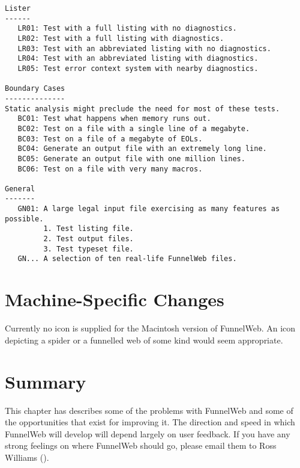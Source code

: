 \begin{verbatim}
Lister
------
   LR01: Test with a full listing with no diagnostics.
   LR02: Test with a full listing with diagnostics.
   LR03: Test with an abbreviated listing with no diagnostics.
   LR04: Test with an abbreviated listing with diagnostics.
   LR05: Test error context system with nearby diagnostics.

Boundary Cases
--------------
Static analysis might preclude the need for most of these tests.
   BC01: Test what happens when memory runs out.
   BC02: Test on a file with a single line of a megabyte.
   BC03: Test on a file of a megabyte of EOLs.
   BC04: Generate an output file with an extremely long line.
   BC05: Generate an output file with one million lines.
   BC06: Test on a file with very many macros.

General
-------
   GN01: A large legal input file exercising as many features as possible.
         1. Test listing file.
         2. Test output files.
         3. Test typeset file.
   GN... A selection of ten real-life FunnelWeb files.
\end{verbatim}

\section{Machine-Specific Changes}

 Currently no icon is supplied for the
Macintosh version of FunnelWeb. An icon depicting a spider or a funnelled
web of some kind would seem appropriate.

\section{Summary}

This chapter has describes some of the problems with FunnelWeb and some of the
opportunities that exist for improving it. The direction and speed in which
FunnelWeb will develop will depend largely on user feedback. If you have any
strong feelings on where FunnelWeb should go, please email them to
Ross Williams ().


